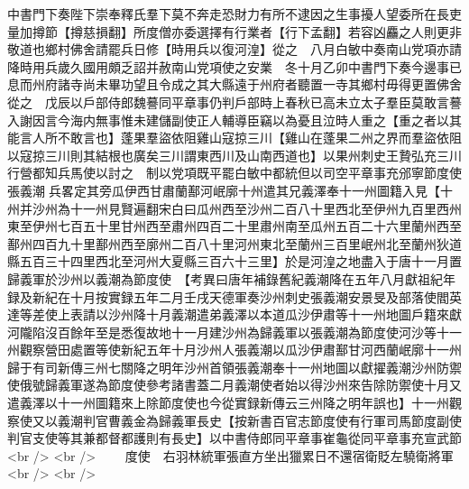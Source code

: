 中書門下奏陛下崇奉釋氏羣下莫不奔走恐財力有所不逮因之生事擾人望委所在長吏量加撙節【撙慈損翻】所度僧亦委選擇有行業者【行下孟翻】若容凶麤之人則更非敬道也鄉村佛舍請罷兵日修【時用兵以復河湟】從之　八月白敏中奏南山党項亦請降時用兵歲久國用頗乏詔并赦南山党項使之安業　冬十月乙卯中書門下奏今邊事已息而州府諸寺尚未畢功望且令成之其大縣遠于州府者聽置一寺其鄉村毋得更置佛舍從之　戊辰以戶部侍郎魏謩同平章事仍判戶部時上春秋已高未立太子羣臣莫敢言謩入謝因言今海内無事惟未建儲副使正人輔導臣竊以為憂且泣時人重之【重之者以其能言人所不敢言也】蓬果羣盜依阻雞山寇掠三川【雞山在蓬果二州之界而羣盜依阻以寇掠三川則其結根也廣矣三川謂東西川及山南西道也】以果州刺史王贄弘充三川行營都知兵馬使以討之　制以党項既平罷白敏中都統但以司空平章事充邠寧節度使　張義潮兵畧定其旁瓜伊西甘肅蘭鄯河岷廓十州遣其兄義澤奉十一州圖籍入見【十州并沙州為十一州見賢遍翻宋白曰瓜州西至沙州二百八十里西北至伊州九百里西州東至伊州七百五十里甘州西至肅州四百二十里肅州南至瓜州五百二十六里蘭州西至鄯州四百九十里鄯州西至廓州二百八十里河州東北至蘭州三百里岷州北至蘭州狄道縣五百三十四里西北至河州大夏縣三百六十三里】於是河湟之地盡入于唐十一月置歸義軍於沙州以義潮為節度使　【考異曰唐年補錄舊紀義潮降在五年八月獻祖紀年録及新紀在十月按實録五年二月壬戌天德軍奏沙州刺史張義潮安景旻及部落使閻英達等差使上表請以沙州降十月義潮遣弟義澤以本道瓜沙伊肅等十一州地圖戶籍來獻河隴陷沒百餘年至是悉復故地十一月建沙州為歸義軍以張義潮為節度使河沙等十一州觀察營田處置等使新紀五年十月沙州人張義潮以瓜沙伊肅鄯甘河西蘭岷廓十一州歸于有司新傳三州七關降之明年沙州首領張義潮奉十一州地圖以獻擢義潮沙州防禦使俄號歸義軍遂為節度使參考諸書蓋二月義潮使者始以得沙州來告除防禦使十月又遣義澤以十一州圖籍來上除節度使也今從實録新傳云三州降之明年誤也】十一州觀察使又以義潮判官曹義金為歸義軍長史【按新書百官志節度使有行軍司馬節度副使判官支使等其兼都督都護則有長史】以中書侍郎同平章事崔龜從同平章事充宣武節<br />
<br />
　　度使　右羽林統軍張直方坐出獵累日不還宿衛貶左驍衛將軍<br />
<br />
